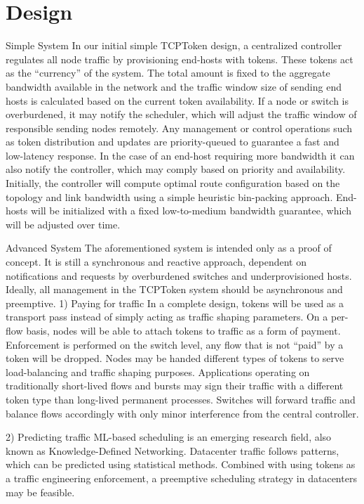 \section{Design}
\label{sec:design}

Simple System
In our initial simple TCPToken design, a centralized controller regulates all node traffic by provisioning end-hosts with tokens.
These tokens act as the “currency” of the system. The total amount is fixed to the aggregate bandwidth available in the network and the traffic window size of sending end hosts is calculated based on the current token availability. If a node or switch is overburdened, it may notify the scheduler, which will adjust the traffic window of responsible sending nodes remotely. Any management or control operations such as token distribution and updates are priority-queued to guarantee a fast and low-latency response. In the case of an end-host requiring more bandwidth it can also notify the controller, which may comply based on priority and availability.
Initially, the controller will compute optimal route configuration based on the topology and link bandwidth using a simple heuristic bin-packing approach. End-hosts will be initialized with a fixed low-to-medium bandwidth guarantee, which will be adjusted over time.

Advanced System
The aforementioned system is intended only as a proof of concept. It is still a  synchronous and reactive approach, dependent on notifications and requests by overburdened switches and underprovisioned hosts. 
Ideally, all management in the TCPToken system should be asynchronous and preemptive. 
1) Paying for traffic
In a complete design, tokens will be used as a transport pass instead of simply acting as traffic shaping parameters. On a per-flow basis, nodes will be able to attach tokens to traffic as a form of payment. Enforcement is performed on the switch level, any flow that is not “paid” by a token will be dropped. Nodes may be handed different types of tokens to serve load-balancing and traffic shaping purposes. Applications operating on traditionally short-lived flows and bursts may sign their traffic with a different token type than long-lived permanent processes. Switches will forward traffic and balance flows accordingly with only minor interference from the central controller.

2) Predicting traffic
ML-based scheduling is an emerging research field, also known as Knowledge-Defined Networking. Datacenter traffic follows patterns, which can be predicted using statistical methods.
Combined with using tokens as a traffic engineering enforcement, a preemptive scheduling strategy in datacenters may be feasible. 

